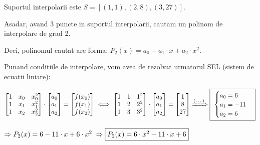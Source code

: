 \documentclass{article}
\begin{document}
Suportul interpolarii este $S=[(1,1), (2,8), (3,27)]$.

Asadar, avand 3 puncte in suportul interpolarii, cautam un polinom de interpolare de grad 2.

Deci, polinomul cautat are forma: $P_2(x) = a_0 + a_1\cdot x + a_2 \cdot x^2$.

Punand conditiile de interpolare, vom avea de rezolvat urmatorul SEL (sistem de ecuatii liniare):

\[
\begin{bmatrix}
    1 & x_0 & x_0^2 \\
    1 & x_1 & x_1^2 \\
    1 & x_2 & x_2^2 \\
\end{bmatrix}
\cdot
\begin{bmatrix}
    a_0 \\
    a_1 \\
    a_2 \\
\end{bmatrix}
=
\begin{bmatrix}
    f(x_0) \\
    f(x_1) \\
    f(x_2) \\
\end{bmatrix}
\iff
\begin{bmatrix}
    1 & 1 & 1^2 \\
    1 & 2 & 2^2 \\
    1 & 3 & 3^2 \\
\end{bmatrix}
\cdot
\begin{bmatrix}
    a_0 \\
    a_1 \\
    a_2 \\
\end{bmatrix}
=
\begin{bmatrix}
    1 \\
    8 \\
    27 \\
\end{bmatrix}
\xRightarrow[\text{}]{\text{(\dots)}}
\framebox{
$\begin{cases}
  a_0 = 6 \\
  a_1 = -11 \\
  a_2 = 6 \\
\end{cases}$}
\]

$\Rightarrow P_2(x) = 6 - 11 \cdot x + 6 \cdot x^2 \; \Rightarrow \framebox{$P_2(x) = 6 \cdot x^2 - 11 \cdot x + 6$}$\\
\end{document}
